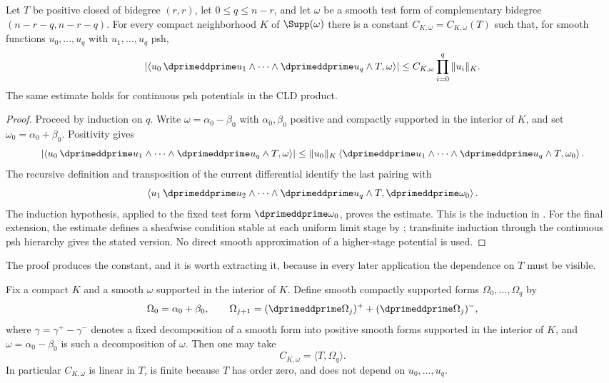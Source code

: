 \begin{theorem}
\label{thm:cld-cln}
Let $T$ be positive closed of bidegree $(r,r)$, let $0\leq q\leq n-r$,
and let $\omega$ be a smooth test form of complementary bidegree
$(n-r-q,n-r-q)$.  For every compact neighborhood $K$ of
$\Supp(\omega)$ there is a constant $C_{K,\omega}=C_{K,\omega}(T)$ such that, for smooth
functions $u_0,\ldots,u_q$ with $u_1,\ldots,u_q$ psh,
\[
 \left|\left\langle
 u_0\,\dprimeddprime u_1\wedge\cdots\wedge
 \dprimeddprime u_q\wedge T,\omega\right\rangle\right|
 \leq C_{K,\omega}\prod_{i=0}^q\|u_i\|_K.
\]
The same estimate holds for continuous psh potentials in the CLD product.
\end{theorem}
\begin{proof}
Proceed by induction on $q$.  Write $\omega=\alpha_0-\beta_0$ with
$\alpha_0,\beta_0$ positive and compactly supported in the interior of $K$,
and set $\omega_0=\alpha_0+\beta_0$.  Positivity gives
\[
 \left|\left\langle
 u_0\,\dprimeddprime u_1\wedge\cdots\wedge
 \dprimeddprime u_q\wedge T,\omega\right\rangle\right|
 \leq \|u_0\|_K
 \left\langle\dprimeddprime u_1\wedge\cdots\wedge
 \dprimeddprime u_q\wedge T,\omega_0\right\rangle.
\]
The recursive definition and transposition of the current differential
identify the last pairing with
\[
 \left\langle
 u_1\,\dprimeddprime u_2\wedge\cdots\wedge
 \dprimeddprime u_q\wedge T,\dprimeddprime\omega_0\right\rangle.
\]
The induction hypothesis, applied to the fixed test form
$\dprimeddprime\omega_0$, proves the estimate.  This is the induction in
\cite[Proposition~8.4.1]{CLD25}.  For the final
extension, the estimate defines a sheafwise condition stable at each uniform
limit stage by ; transfinite induction
through the continuous psh hierarchy gives the stated version.  No direct
smooth approximation of a higher-stage potential is used.
\end{proof}

The proof produces the constant, and it is worth extracting it, because in
every later application the dependence on $T$ must be visible.

\begin{proposition}
\label{prop:ch16-cln-constant}
Fix a compact $K$ and a smooth $\omega$ supported in the interior of $K$.
Define smooth compactly supported forms $\Omega_0,\ldots,\Omega_q$ by
\[
 \Omega_0=\alpha_0+\beta_0,
 \qquad
 \Omega_{j+1}=(\dprimeddprime\Omega_j)^++(\dprimeddprime\Omega_j)^-,
\]
where $\gamma=\gamma^+-\gamma^-$ denotes a fixed decomposition of a smooth
form into positive smooth forms supported in the interior of $K$, and
$\omega=\alpha_0-\beta_0$ is such a decomposition of $\omega$.  Then one may
take
\[
 C_{K,\omega}=\langle T,\Omega_q\rangle .
\]
In particular $C_{K,\omega}$ is linear in $T$, is finite because $T$ has
order zero, and does not depend on $u_0,\ldots,u_q$.
\end{proposition}

